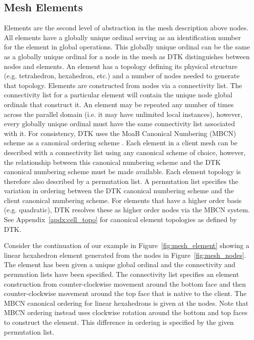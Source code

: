 \documentclass[letterpaper,12pt]{article}
\begin{document}
\subsection{Mesh Elements}\label{subsec:elements}
Elements are the second level of abstraction in the mesh description
above nodes. All elements have a globally unique ordinal serving as an
identification number for the element in global operations. This
globally unique ordinal can be the same as a globally unique ordinal
for a node in the mesh as DTK distinguishes between nodes and
elements. An element has a topology defining its physical structure
(e.g. tetrahedron, hexahedron, etc.) and a number of nodes needed to
generate that topology. Elements are constructed from nodes via a
connectivity list. The connectivity list for a particular element will
contain the unique node global ordinals that construct it. An element
may be repeated any number of times across the parallel domain
(i.e. it may have unlimited local instances), however, every globally
unique ordinal must have the same connectivity list associated with
it. For consistency, DTK uses the MoaB Canonical Numbering (MBCN)
scheme as a canonical ordering scheme \cite{Tautges_2009}. Each
element in a client mesh can be described with a connectivity list
using any canonical scheme of choice, however, the relationship
between this canonical numbering scheme and the DTK canonical
numbering scheme must be made available. Each element topology is
therefore also described by a permutation list. A permutation list
specifies the variation in ordering between the DTK canonical
numbering scheme and the client canonical numbering scheme. For
elements that have a higher order basis (e.g. quadratic), DTK resolves
these as higher order nodes via the MBCN system. See
Appendix~\ref{apdx:cell_topo} for canonical element topologies as
defined by DTK.

Consider the continuation of our example in
Figure~\ref{fig:mesh_element} showing a linear hexahedron element
generated from the nodes in Figure~\ref{fig:mesh_nodes}. The element
has been given a unique global ordinal and the connectivity and
permuation lists have been specified. The connectivity list specifies
an element construction from counter-clockwise movement around the
bottom face and then counter-clockwise movement around the top face
that is native to the client. The MBCN canonical ordering for linear
hexahedrons is given at the nodes. Note that MBCN ordering instead
uses clockwise rotation around the bottom and top faces to construct
the element. This difference in ordering is specified by the given
permutation list.
\end{document}

